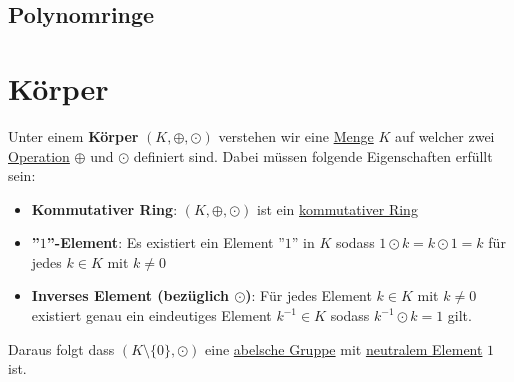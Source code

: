 \documentclass[../../main.tex]{subfiles}
\begin{document}
		\subsection{Polynomringe}
		
		\section{Körper}
		\begin{definition}[Körper]
			Unter einem \textbf{Körper} $(K, \oplus, \odot)$ verstehen wir eine \hyperref[def:Menge]{Menge} $K$ auf welcher zwei \hyperref[def:Operation]{Operation} $\oplus$ und $\odot$ definiert sind. Dabei müssen folgende Eigenschaften erfüllt sein: 
			\begin{itemize}
				\item \textbf{Kommutativer Ring}: $(K, \oplus, \odot)$ ist ein \hyperref[def:kommutativerRing]{kommutativer Ring}
				\item \textbf{''$1$''-Element}: Es existiert ein Element ''$1$'' in $K$ sodass $1 \odot k = k \odot 1 = k$ für jedes $k \in K$ mit $k\not=0$ 
				\item \textbf{Inverses Element (bezüglich $\odot$)}: Für jedes Element $k\in K$ mit $k\not = 0$ existiert genau ein eindeutiges Element $k^{-1} \in K$ sodass $k^{-1} \odot k = 1$ gilt.
			\end{itemize}
			Daraus folgt dass $(K\setminus \{0\}, \odot)$ eine \hyperref[def:abelscheGruppe]{abelsche Gruppe} mit \hyperref[def:neutralesElement]{neutralem Element} $1$ ist.
		\end{definition}
	
\end{document}
